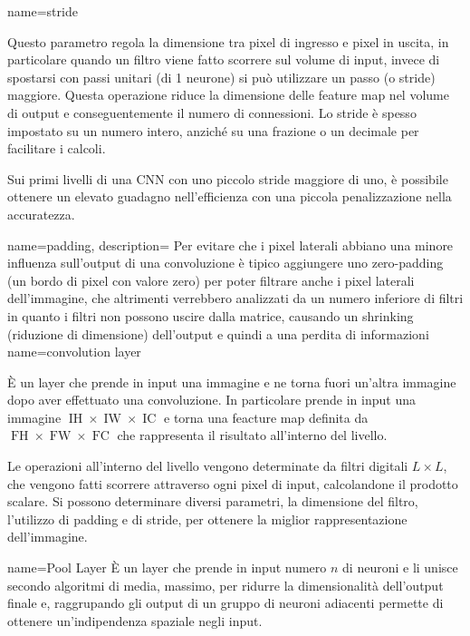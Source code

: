  {
    name=stride} {Questo parametro regola la dimensione tra pixel di ingresso e pixel in uscita, in particolare quando un filtro viene fatto scorrere sul volume di input, invece di spostarsi con passi unitari (di 1 neurone) si può utilizzare un passo (o stride) maggiore. Questa operazione riduce la dimensione delle feature map nel volume di output e conseguentemente il numero di connessioni. Lo stride è spesso impostato su un numero intero, anziché su una frazione o un decimale per facilitare i calcoli.

    Sui primi livelli di una CNN con uno piccolo stride maggiore di uno, è possibile ottenere un elevato guadagno nell'efficienza con una piccola penalizzazione nella accuratezza.}

 {
    name=padding,
    description= {Per evitare che i pixel laterali abbiano una minore influenza sull'output di una convoluzione è tipico aggiungere uno zero-padding (un bordo di pixel con valore zero) per poter filtrare anche i pixel laterali dell’immagine, che altrimenti verrebbero analizzati da un numero inferiore di filtri in quanto i filtri non possono uscire dalla matrice, causando un shrinking (riduzione di dimensione) dell’output e quindi a una perdita di informazioni}
}
{
    name={convolution layer}}{
    È un layer che prende in input una immagine e ne torna fuori un’altra immagine dopo aver effettuato una \gls{convoluzione}. In particolare prende in input una immagine \(\operatorname{IH} \times \operatorname{IW} \times \operatorname{IC}\) e torna una feacture map definita da \(\operatorname{FH} \times \operatorname{FW} \times \operatorname{FC}\) che rappresenta il risultato all'interno del livello. 
    
    Le operazioni all’interno del livello vengono determinate da filtri digitali \(L \times L\), che vengono fatti scorrere attraverso
    ogni pixel di input, calcolandone il prodotto scalare. Si possono determinare diversi
    parametri, la dimensione del filtro, l’utilizzo di \gls{padding} e di \gls{stride}, per ottenere la miglior rappresentazione dell’immagine.} 

{
    name={Pool Layer}}{
    È un layer che prende in input numero \(n\) di neuroni e li unisce secondo algoritmi di
    media, massimo, per ridurre la dimensionalità dell’output finale e, raggrupando gli
    output di un gruppo di neuroni adiacenti permette di ottenere un’indipendenza spaziale
    negli input.}

